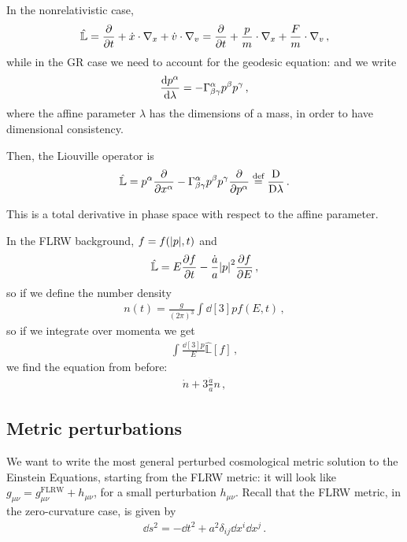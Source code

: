 \documentclass[main.tex]{subfiles}
\begin{document}
In the nonrelativistic case, 
%
\begin{align}
\hat{\mathbb{L}} = \pdv{}{t} + \dot{x} \cdot \nabla_{x} + \dot{v} \cdot \nabla_{v} = \pdv{}{t} + \frac{p}{m} \cdot \nabla_{x} + \frac{F}{m} \cdot \nabla_{v} 
\,,
\end{align}
%
while in the GR case we need to account for the geodesic equation: and we write 
%
\begin{align}
\dv{p^{\alpha }}{\lambda } = - \Gamma^{\alpha }_{\beta \gamma } p^{\beta } p^{\gamma }
\,,
\end{align}
%
where the affine parameter \(\lambda \) has the dimensions of a mass, in order to have dimensional consistency.

Then, the Liouville operator is 
%
\begin{align}
\hat{\mathbb{L}} = p^{\alpha } \pdv{}{x^{\alpha }}-  
\Gamma^{\alpha }_{\beta \gamma } p^{\beta } p^{\gamma } \pdv{}{p^{\alpha }} \overset{\text{def}}{=} \frac{\mathrm{D}}{\mathrm{D}\lambda }
\,.
\end{align}

This is a total derivative in phase space with respect to the affine parameter. 

In the FLRW background, \(f = f(\abs{p}, t)\) and 
%
\begin{align}
\hat{\mathbb{L}} = E \pdv{f}{t} - \frac{\dot{a}}{a} \abs{p}^2 \pdv{f}{E}
\,,
\end{align}
%
so if we define the number density 
%
\begin{align}
n(t) = \frac{g}{(2\pi )^3} \int \dd[3]{p} f(E, t)
\,,
\end{align}
%
so if we integrate over momenta we get 
%
\begin{align}
\int \frac{ \dd[3]{p}}{E} \hat{\mathbb{L}}[f] 
\,,
\end{align}
%
we find the equation from before: 
%
\begin{align}
\dot{n} + 3 \frac{\dot{a}}{a} n 
\,,
\end{align}
%

\subsection{Metric perturbations}

We want to write the most general perturbed cosmological metric solution to the Einstein Equations, starting from the FLRW metric: it will look like \(g_{\mu \nu } = g_{\mu \nu }^{\text{FLRW}} + h_{\mu \nu }\), for a small perturbation \(h_{\mu \nu }\).
Recall that the FLRW metric, in the zero-curvature case, is given by 
%
\begin{align}
\dd{s^2} =  - \dd{t^2} + a^2 \delta_{ij} \dd{x^{i}} \dd{x^{j}}
\,.
\end{align}
%
\end{document}
